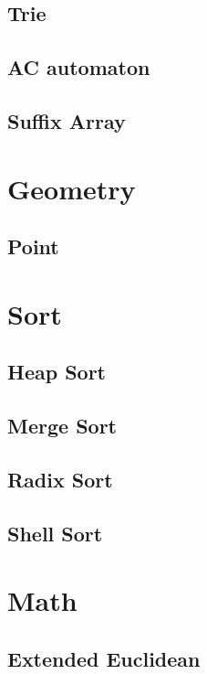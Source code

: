 \documentclass[a4paper,10pt,twocolumn,oneside]{article}
\begin{document}
\subsection{Trie}

\subsection{AC automaton}

\subsection{Suffix Array}

\newpage

\section{Geometry}
\subsection{Point}

\newpage

\section{Sort}
\subsection{Heap Sort}

\subsection{Merge Sort}

\subsection{Radix Sort}

\subsection{Shell Sort}

\newpage
\section{Math}
\subsection{Extended Euclidean}

\end{document}
